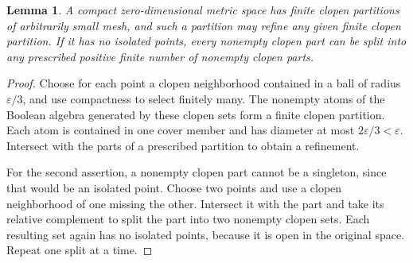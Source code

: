 \documentclass[11pt,oneside,openany]{book}
\newtheorem{lemma}[theorem]{Lemma}
\theoremstyle{definition}
\theoremstyle{remark}
\newcommand{\eps}{\varepsilon}
\begin{document}
\begin{lemma}\label{d10:18:clopen-partitions}
A compact zero-dimensional metric space has finite clopen partitions
of arbitrarily small mesh, and such a partition may refine any given
finite clopen partition. If it has no isolated points, every nonempty
clopen part can be split into any prescribed positive finite number of nonempty
clopen parts.
\end{lemma}
\begin{proof}
Choose for each point a clopen neighborhood contained in a ball of
radius $\eps/3$, and use compactness to select finitely many.
The nonempty atoms of the Boolean algebra generated by these clopen
sets form a finite clopen partition. Each atom is contained in one
cover member and has diameter at most $2\eps/3<\eps$. Intersect with the
parts of a prescribed partition to obtain a refinement.

For the second assertion, a nonempty clopen part cannot be a singleton,
since that would be an isolated point. Choose two points and use a
clopen neighborhood of one missing the other. Intersect it with the
part and take its relative complement to split the part into two
nonempty clopen sets. Each resulting set again has no isolated points,
because it is open in the original space. Repeat one split at a time.
\end{proof}
\end{document}
